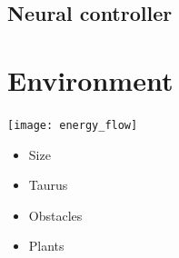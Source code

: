 \documentclass[
auto_sections,
monitor_progress,
draft
]{mannbeamer}
\begin{document}
\subsection{Neural controller}
\begin{frame}
 \begin{tikzpicture}
  
 \end{tikzpicture}
\end{frame}


\section{Environment}
\begin{frame}
 \centering
 \texttt{[image: energy\_flow]}
\end{frame}

\begin{frame}
 \begin{itemize}
  \item Size
  \item Taurus
  \item Obstacles
  \item Plants
 \end{itemize}

\end{frame}


\doendpages[duration=30 s]{}
\end{document}
